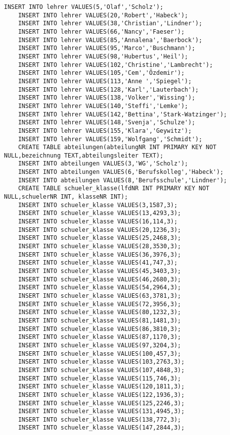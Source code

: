 \begin{lstlisting}[breaklines=True, numbers=none, basicstyle=\tiny, keepspaces=false]
	INSERT INTO lehrer VALUES(5,'Olaf','Scholz');
	INSERT INTO lehrer VALUES(20,'Robert','Habeck');
	INSERT INTO lehrer VALUES(38,'Christian','Lindner');
	INSERT INTO lehrer VALUES(66,'Nancy','Faeser');
	INSERT INTO lehrer VALUES(85,'Annalena','Baerbock');
	INSERT INTO lehrer VALUES(95,'Marco','Buschmann');
	INSERT INTO lehrer VALUES(98,'Hubertus','Heil');
	INSERT INTO lehrer VALUES(102,'Christine','Lambrecht');
	INSERT INTO lehrer VALUES(105,'Cem','Özdemir');
	INSERT INTO lehrer VALUES(113,'Anne ','Spiegel');
	INSERT INTO lehrer VALUES(128,'Karl','Lauterbach');
	INSERT INTO lehrer VALUES(138,'Volker','Wissing');
	INSERT INTO lehrer VALUES(140,'Steffi','Lemke');
	INSERT INTO lehrer VALUES(142,'Bettina','Stark-Watzinger');
	INSERT INTO lehrer VALUES(148,'Svenja','Schulze');
	INSERT INTO lehrer VALUES(155,'Klara','Geywitz');
	INSERT INTO lehrer VALUES(159,'Wolfgang','Schmidt');
	CREATE TABLE abteilungen(abteilungNR INT PRIMARY KEY NOT NULL,bezeichnung TEXT,abteilungsleiter TEXT);
	INSERT INTO abteilungen VALUES(3,'WG','Scholz');
	INSERT INTO abteilungen VALUES(6,'Berufskolleg','Habeck');
	INSERT INTO abteilungen VALUES(8,'Berufsschule','Lindner');
	CREATE TABLE schueler_klasse(lfdNR INT PRIMARY KEY NOT NULL,schuelerNR INT, klasseNR INT);
	INSERT INTO schueler_klasse VALUES(3,1587,3);
	INSERT INTO schueler_klasse VALUES(13,4293,3);
	INSERT INTO schueler_klasse VALUES(16,114,3);
	INSERT INTO schueler_klasse VALUES(20,1236,3);
	INSERT INTO schueler_klasse VALUES(25,2468,3);
	INSERT INTO schueler_klasse VALUES(28,3530,3);
	INSERT INTO schueler_klasse VALUES(36,3976,3);
	INSERT INTO schueler_klasse VALUES(41,747,3);
	INSERT INTO schueler_klasse VALUES(45,3403,3);
	INSERT INTO schueler_klasse VALUES(46,2680,3);
	INSERT INTO schueler_klasse VALUES(54,2964,3);
	INSERT INTO schueler_klasse VALUES(63,3781,3);
	INSERT INTO schueler_klasse VALUES(72,3956,3);
	INSERT INTO schueler_klasse VALUES(80,1232,3);
	INSERT INTO schueler_klasse VALUES(81,1481,3);
	INSERT INTO schueler_klasse VALUES(86,3810,3);
	INSERT INTO schueler_klasse VALUES(87,1170,3);
	INSERT INTO schueler_klasse VALUES(97,3204,3);
	INSERT INTO schueler_klasse VALUES(100,457,3);
	INSERT INTO schueler_klasse VALUES(103,2763,3);
	INSERT INTO schueler_klasse VALUES(107,4848,3);
	INSERT INTO schueler_klasse VALUES(115,746,3);
	INSERT INTO schueler_klasse VALUES(120,1811,3);
	INSERT INTO schueler_klasse VALUES(122,1936,3);
	INSERT INTO schueler_klasse VALUES(125,2246,3);
	INSERT INTO schueler_klasse VALUES(131,4945,3);
	INSERT INTO schueler_klasse VALUES(138,772,3);
	INSERT INTO schueler_klasse VALUES(147,2844,3);

\end{lstlisting}
